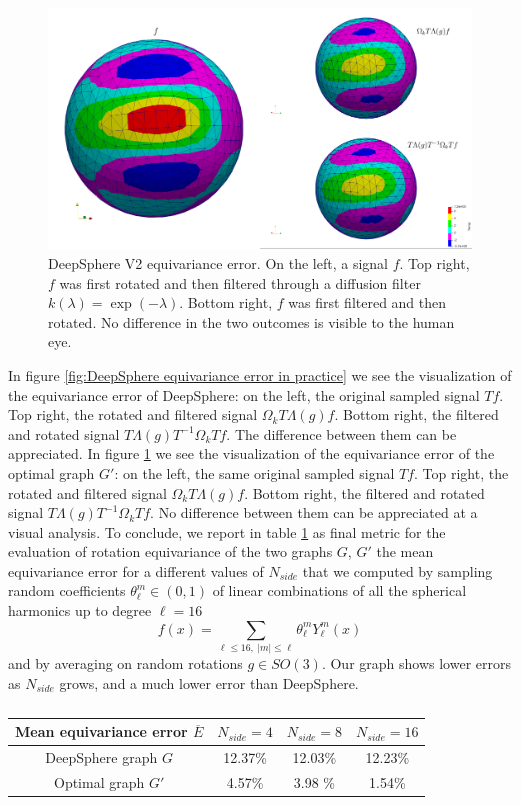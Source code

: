 \begin{figure}[h!]
	\centering
	\includegraphics[width=\textwidth]{../codes/06.Equivariance_error/img_example_thresholdedHKGL/thresholdedHKGL.png}	
	\caption{\label{fig:Optimal equivariance error in practice}DeepSphere V2 equivariance error. On the left, a signal $f$. Top right, $f$ was first rotated and then filtered through a diffusion filter $k(\lambda) = \exp (-\lambda)$. Bottom right, $f$ was first filtered and then rotated. No difference in the two outcomes is visible to the human eye.}
\end{figure}

In figure \ref{fig:DeepSphere equivariance error in practice} we see the visualization of the equivariance error of DeepSphere: on the left, the original sampled signal $Tf$. Top right, the rotated and filtered signal $\Omega_k T \Lambda(g) f$. Bottom right, the filtered and rotated signal $T \Lambda(g) T^{-1} \Omega_k T f $. The difference between them can be appreciated. In figure \ref{fig:Optimal equivariance error in practice} we see the visualization of the equivariance error of the optimal graph $G'$: on the left, the same original sampled signal $Tf$. Top right, the rotated and filtered signal $\Omega_k T \Lambda(g) f$. Bottom right, the filtered and rotated signal $T \Lambda(g) T^{-1} \Omega_k T f $. No difference between them can be appreciated at a visual analysis.
To conclude, we report in table \ref{tab:final results} as final metric for the evaluation of rotation equivariance of the two graphs $G$, $G'$ the mean equivariance error for a different values of $N_{side}$ that we computed by sampling random coefficients $\theta_\ell^m \in(0,1)$ of linear combinations of all the spherical harmonics up to degree $\ell=16$
$$f(x) = \sum_{\ell\leq 16,\ |m|\leq\ell}\theta_\ell^m Y_\ell^m(x)
$$
and by averaging on random rotations $g\in SO(3)$. Our graph shows lower errors as $N_{side}$ grows, and a much lower error than DeepSphere.

\begin{table}
		\centering
\begin{tabular}{c|ccc}
	Mean equivariance error $\overline{E}$& $N_{side}=4$& $N_{side}=8$&$N_{side}=16$ \\\hline
	DeepSphere graph $G$ & 12.37\% & 12.03\% & 12.23\% \\
	Optimal graph $G'$ & 4.57\% & 3.98 \% & 1.54\%
\end{tabular}
\caption{\label{tab:final results}}
\end{table}

